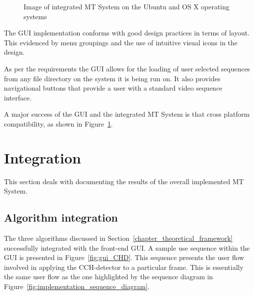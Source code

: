 \begin{figure}
    \caption{Image of integrated MT System on the Ubuntu and OS X operating systems\label{fig:gui_integration}}
\end{figure}
        
The GUI implementation conforms with good design practices in terms of layout.
This evidenced by menu groupings and the use of intuitive visual icons in the
design. 

As per the requirements the GUI allows for the loading of user selected
sequences from any file directory on the system it is being run on. It also provides
navigational buttons that provide a user with a standard video sequence interface. 

A major success of the GUI and the integrated MT System is that cross platform
compatibility, as shown in Figure~\ref{fig:gui_integration}. 

\section{Integration}\label{results_integration}
This section deals with documenting the results of the overall implemented MT
System.

\subsection{Algorithm integration}
The three algorithms discussed in Section~\ref{chapter_theoretical_framework}
successfully integrated with the front-end GUI. A sample use sequence within the GUI is
presented in Figure~\ref{fig:gui_CHD}. This sequence presents the user flow
involved in applying the CCH-detector to a particular frame. This is essentially
the same user flow as the one highlighted by the sequence diagram in
Figure~\ref{fig:implementation_sequence_diagram}. 

